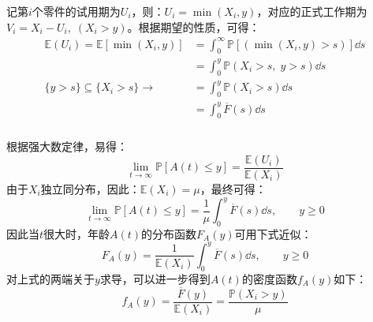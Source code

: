 \documentclass[t]{beamer}
\renewcommand{\Pr}{\mathbb{P}}
\newcommand{\E}{\mathbb{E}}
\begin{document}
\begin{frame}
  \frametitle{}
  \begin{center}
  \end{center}
  
  记第$i$个零件的试用期为$U_i$，则：$U_i=\min(X_i,y)$，对应的正式工作期为$V_i=X_i-U_i,\; (X_i>y)$。根据期望的性质，可得：
  \[\begin{split}
      \E(U_i) = \E[\min(X_i,y)]&=\int^{\infty}_0 \Pr[(\min(X_i,y)>s)]\dd s\\
    &=\int^y_0  \Pr(X_i>s,\; y>s)\dd s\\
   \{y>s\}\subseteq\{X_i>s\}\to   &=\int^y_0  \Pr(X_i>s)\dd s\\
      &=\int^y_0 \overline{F}(s)\dd s
  \end{split}\]
\end{frame}


\begin{frame}
  \frametitle{}
  根据强大数定律，易得：
  \[\lim_{t\to\infty}\Pr[A(t)\le y]=\frac{\E(U_i)}{\E(X_i)}\]
  由于$X_i$独立同分布，因此：$\E(X_i)=\mu$，最终可得：
  \[\lim_{t\to\infty}\Pr[A(t)\le y]=\frac{1}{\mu}\int^y_0 \overline{F}(s)\dd s,\qquad y\ge 0\]
  因此当$t$很大时，年龄$A(t)$的分布函数$ F_A(y)$可用下式近似：
  \begin{equation*}
      F_A(y)=\frac{1}{\E(X_i)}\int^y_0 \overline{F}(s)\dd s,\qquad y\ge 0
  \end{equation*}
  对上式的两端关于$y$求导，可以进一步得到$A(t)$的密度函数$f_A(y)$如下：
  \begin{equation*}
      f_A(y)=\frac{\overline{F}(y)}{\E(X_i)}=\frac{\Pr(X_i>y)}{\mu}
  \end{equation*}
  

\end{frame}
\end{document}
